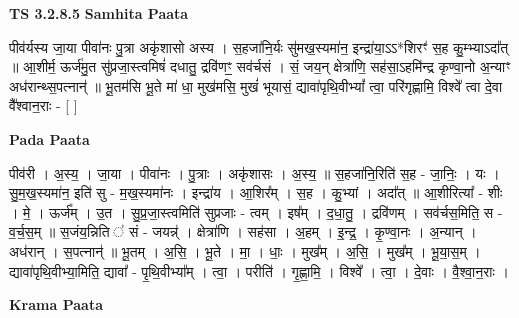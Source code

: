 \documentclass[17pt]{extarticle}
\begin{document}
\textbf{TS 3.2.8.5 } \newline
\textbf{Samhita Paata} \newline

पीव॑र्यस्य जा॒या पीवा॑नः पु॒त्रा अकृ॑शासो अस्य । स॒हजा॑नि॒र्यः सु॑मख॒स्यमा॑न॒ इन्द्रा॑या॒ऽऽ*शिरꣳ॑ स॒ह कु॒म्भ्याऽदा᳚त् ॥ आ॒शीर्म॒ ऊर्ज॑मु॒त सु॑प्रजा॒स्त्वमिषं॑ दधातु॒ द्रवि॑णꣳ॒॒ सव॑र्चसं । सं॒ जय॒न् क्षेत्रा॑णि॒ सह॑सा॒ऽहमि॑न्द्र कृण्वा॒नो अ॒न्याꣳ अध॑रान्थ्स॒पत्नान्॑ ॥ भू॒तम॑सि भू॒ते मा॑ धा॒ मुख॑मसि॒ मुखं॑ भूयासं॒ द्यावा॑पृथि॒वीभ्यां᳚ त्वा॒ परि॑गृह्णामि॒ विश्वे᳚ त्वा दे॒वा वै᳚श्वान॒राः - [  ] \newline

\textbf{Pada Paata} \newline

पीव॑री । अ॒स्य॒ । जा॒या । पीवा॑नः । पु॒त्राः । अकृ॑शासः । अ॒स्य॒ ॥ स॒हजा॑नि॒रिति॑ स॒ह - जा॒निः॒ । यः । सु॒म॒ख॒स्यमा॑न॒ इति॑ सु - म॒ख॒स्यमा॑नः । इन्द्रा॑य । आ॒शिर᳚म् । स॒ह । कु॒भ्यां । अदा᳚त् ॥ आ॒शीरित्या᳚ - शीः । मे॒ । ऊर्ज᳚म् । उ॒त । सु॒प्र॒जा॒स्त्वमिति॑ सुप्रजाः - त्वम् । इष᳚म् । द॒धा॒तु॒ । द्रवि॑णम् । सव॑र्चस॒मिति॒ स - व॒र्च॒स॒म् ॥ स॒जंय॒न्निति ॑ सं - जयन्न्॑ । क्षेत्रा॑णि । सह॑सा । अ॒हम् । इ॒न्द्र॒ । कृ॒ण्वा॒नः । अ॒न्यान् । अध॑रान् । स॒पत्नान्॑ ॥ भू॒तम् । अ॒सि॒ । भू॒ते । मा॒ । धाः॒ । मुख᳚म् । अ॒सि॒ । मुख᳚म् । भू॒या॒स॒म् । द्यावा॑पृथि॒वीभ्या॒मिति॒ द्यावा᳚ - पृ॒थि॒वीभ्या᳚म् । त्वा॒ । परीति॑ । गृ॒ह्णा॒मि॒ । विश्वे᳚ । त्वा॒ । दे॒वाः । वै॒श्वा॒न॒राः ।  \newline


\textbf{Krama Paata} \newline
\end{document}
